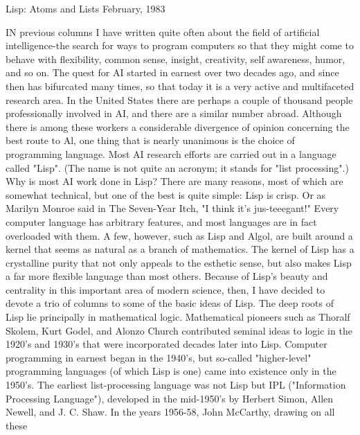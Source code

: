 
                          Lisp: Atoms and Lists
                                    February, 1983


IN previous columns I have written quite often about the field of artificial
intelligence-the search for ways to program computers so that they might come to
behave with flexibility, common sense, insight, creativity, self awareness, humor, and
so on. The quest for AI started in earnest over two decades ago, and since then has
bifurcated many times, so that today it is a very active and multifaceted research area.
In the United States there are perhaps a couple of thousand people professionally
involved in AI, and there are a similar number abroad. Although there is among these
workers a considerable divergence of opinion concerning the best route to Al, one
thing that is nearly unanimous is the choice of programming language. Most AI
research efforts are carried out in a language called "Lisp". (The name is not quite an
acronym; it stands for "list processing".)
        Why is most AI work done in Lisp? There are many reasons, most of which
are somewhat technical, but one of the best is quite simple: Lisp is crisp. Or as
Marilyn Monroe said in The Seven-Year Itch, "I think it's jus-teeegant!" Every
computer language has arbitrary features, and most languages are in fact overloaded
with them. A few, however, such as Lisp and Algol, are built around a kernel that
seems as natural as a branch of mathematics. The kernel of Lisp has a crystalline
purity that not only appeals to the esthetic sense, but also makes Lisp a far more
flexible language than most others. Because of Lisp's beauty and centrality in this
important area of modern science, then, I have decided to devote a trio of columns to
some of the basic ideas of Lisp.
        The deep roots of Lisp lie principally in mathematical logic. Mathematical
pioneers such as Thoralf Skolem, Kurt Godel, and Alonzo Church contributed
seminal ideas to logic in the 1920's and 1930's that were incorporated decades later
into Lisp. Computer programming in earnest began in the 1940's, but so-called
"higher-level" programming languages (of which Lisp is one) came into existence
only in the 1950's. The earliest list-processing language was not Lisp but IPL
("Information Processing Language"), developed in the mid-1950's by Herbert Simon,
Allen Newell, and J. C. Shaw. In the years 1956-58, John McCarthy, drawing on all
these




